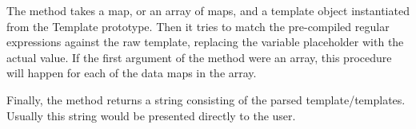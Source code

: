 The method takes a map, or an array of maps, and a template object instantiated from the Template prototype.
Then it tries to match the pre-compiled regular expressions against the raw template, replacing the variable placeholder with the actual value. 
If the first argument of the method were an array, this procedure will happen for each of the data maps in the array.

Finally, the method returns a string consisting of the parsed template/templates. Usually this string would be presented directly to the user.